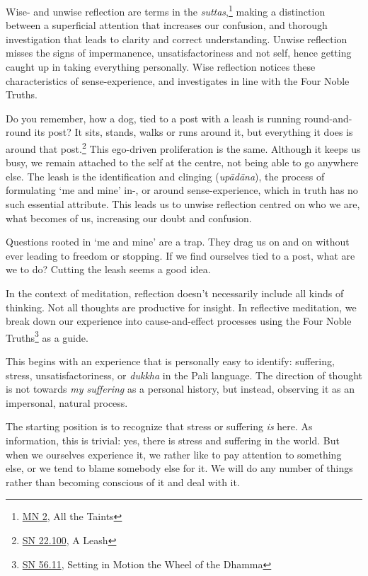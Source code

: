 Wise- and unwise reflection are terms in the \emph{suttas},\footnote{\href{https://suttacentral.net/mn2/en/bodhi}{MN
  2}, All the Taints} making a distinction between a superficial
attention that increases our confusion, and thorough investigation that
leads to clarity and correct understanding. Unwise reflection misses the
signs of impermanence, unsatisfactoriness and not self, hence getting
caught up in taking everything personally. Wise reflection notices these
characteristics of sense-experience, and investigates in line with the
Four Noble Truths.


Do you remember, how a dog, tied to a post with a leash is running
round-and-round its post? It sits, stands, walks or runs around it, but
everything it does is around that post.\footnote{\href{https://suttacentral.net/sn22.100}{SN
  22.100}, A Leash} This ego-driven proliferation is the same. Although
it keeps us busy, we remain attached to the self at the centre, not
being able to go anywhere else. The leash is the identification and
clinging (\emph{upādāna}), the process of formulating `me and mine' in-,
or around sense-experience, which in truth has no such essential
attribute. This leads us to unwise reflection centred on who we are,
what becomes of us, increasing our doubt and confusion.

\enlargethispage*{\baselineskip}

Questions rooted in `me and mine' are a trap. They drag us on and on
without ever leading to freedom or stopping. If we find ourselves tied
to a post, what are we to do? Cutting the leash seems a good idea.

In the context of meditation, reflection doesn't necessarily include all
kinds of thinking. Not all thoughts are productive for insight. In
reflective meditation, we break down our experience into
cause-and-effect processes using the Four Noble Truths\footnote{\href{https://suttacentral.net/sn56.11}{SN
  56.11}, Setting in Motion the Wheel of the Dhamma} as a guide.

This begins with an experience that is personally easy to identify:
suffering, stress, unsatisfactoriness, or \emph{dukkha} in the Pali
language. The direction of thought is not towards \emph{my suffering} as
a personal history, but instead, observing it as an impersonal, natural
process.


The starting position is to recognize that stress or suffering \emph{is}
here. As information, this is trivial: yes, there is stress and
suffering in the world. But when we ourselves experience it, we rather
like to pay attention to something else, or we tend to blame somebody
else for it. We will do any number of things rather than becoming
conscious of it and deal with it.

